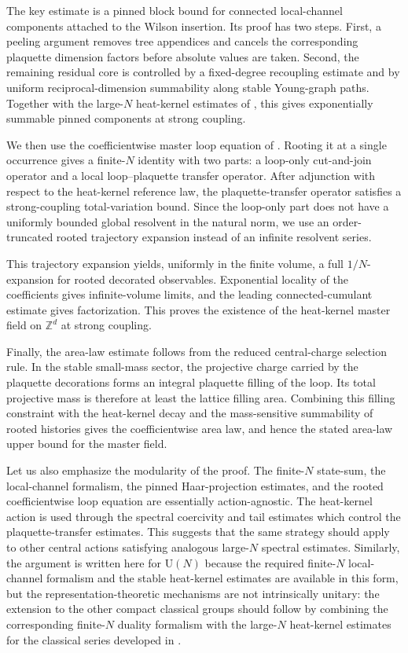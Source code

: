 \documentclass[11pt,a4paper,reqno]{amsart}
\theoremstyle{definition}
\theoremstyle{remark}
\newcommand\U{{\mathrm U}}
\begin{document}
The key estimate is a pinned block bound for connected local-channel components attached to the Wilson insertion. Its proof has two steps. First, a peeling argument removes tree appendices and cancels the corresponding plaquette dimension factors before absolute values are taken. Second, the remaining residual core is controlled by a fixed-degree recoupling estimate and by uniform reciprocal-dimension summability along stable Young-graph paths. Together with the large-$N$ heat-kernel estimates of \cite{LemMai25,LM2}, this gives exponentially summable pinned components at strong coupling.

We then use the coefficientwise master loop equation of \cite{Lem26a}. Rooting it at a single occurrence gives a finite-$N$ identity with two parts: a loop-only cut-and-join operator and a local loop--plaquette transfer operator. After adjunction with respect to the heat-kernel reference law, the plaquette-transfer operator satisfies a strong-coupling total-variation bound. Since the loop-only part does not have a uniformly bounded global resolvent in the natural norm, we use an order-truncated rooted trajectory expansion instead of an infinite resolvent series.

This trajectory expansion yields, uniformly in the finite volume, a full $1/N$-expansion for rooted decorated observables. Exponential locality of the coefficients gives infinite-volume limits, and the leading connected-cumulant estimate gives factorization. This proves the existence of the heat-kernel master field on $\mathbb Z^d$ at strong coupling.

Finally, the area-law estimate follows from the reduced central-charge selection rule. In the stable small-mass sector, the projective charge carried by the plaquette decorations forms an integral plaquette filling of the loop. Its total projective mass is therefore at least the lattice filling area. Combining this filling constraint with the heat-kernel decay and the mass-sensitive summability of rooted histories gives the coefficientwise area law, and hence the stated area-law upper bound for the master field.

Let us also emphasize the modularity of the proof.  The finite-$N$ state-sum, the local-channel formalism, the pinned Haar-projection estimates, and the rooted coefficientwise loop equation are essentially action-agnostic.  The heat-kernel action is used through the spectral coercivity and tail estimates which control the plaquette-transfer estimates.  This suggests that the same strategy should apply to other central actions satisfying analogous large-$N$ spectral estimates.  Similarly, the argument is written here for $\U(N)$ because the required finite-$N$ local-channel formalism and the stable heat-kernel estimates are available in this form, but the representation-theoretic mechanisms are not intrinsically unitary: the extension to the other compact classical groups should follow by combining the corresponding finite-$N$ duality formalism with the large-$N$ heat-kernel estimates for the classical series developed in \cite{LM2}.
\end{document}
